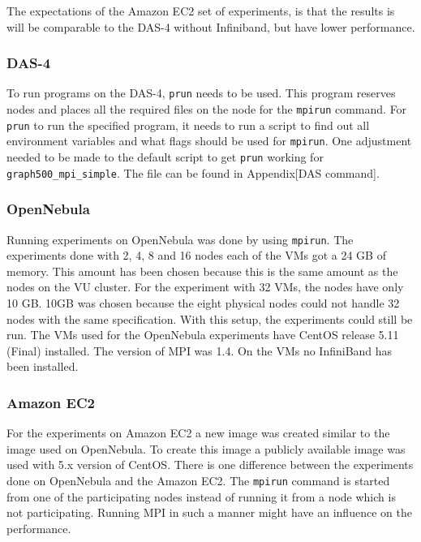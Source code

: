 The expectations of the Amazon EC2 set of experiments, is that the results is will be comparable to the DAS-4 without Infiniband, but have lower performance.

\subsubsection*{DAS-4}
To run programs on the DAS-4, \texttt{prun} needs to be used. This program reserves nodes and places all the required files on the node for the \texttt{mpirun} command. For \texttt{prun} to run the specified program, it needs to run a script to find out all environment variables and what flags should be used for \texttt{mpirun}. One adjustment needed to be made to the default script to get \texttt{prun} working for \texttt{graph500\_mpi\_simple}. The file can be found in Appendix[DAS command].

\subsubsection*{OpenNebula}
Running experiments on OpenNebula was done by using \texttt{mpirun}. The experiments done with 2, 4, 8 and 16 nodes each of the VMs got a 24 GB of memory. This amount has been chosen because this is the same amount as the nodes on the VU cluster. For the experiment with 32 VMs, the nodes have only 10 GB. 10GB was chosen because the eight physical nodes could not handle 32 nodes with the same specification. With this setup, the experiments could still be run. The VMs used for the OpenNebula experiments have CentOS release 5.11 (Final) installed. The version of MPI was 1.4. On the VMs no InfiniBand has been installed.

\subsubsection*{Amazon EC2}
For the experiments on Amazon EC2 a new image was created similar to the image used on OpenNebula. To create this image a publicly available image was used with 5.x version of CentOS. There is one difference between the experiments done on OpenNebula and the Amazon EC2. The \texttt{mpirun} command is started from one of the participating nodes instead of running it from a node which is not participating. Running MPI in such a manner might have an influence on the performance.
